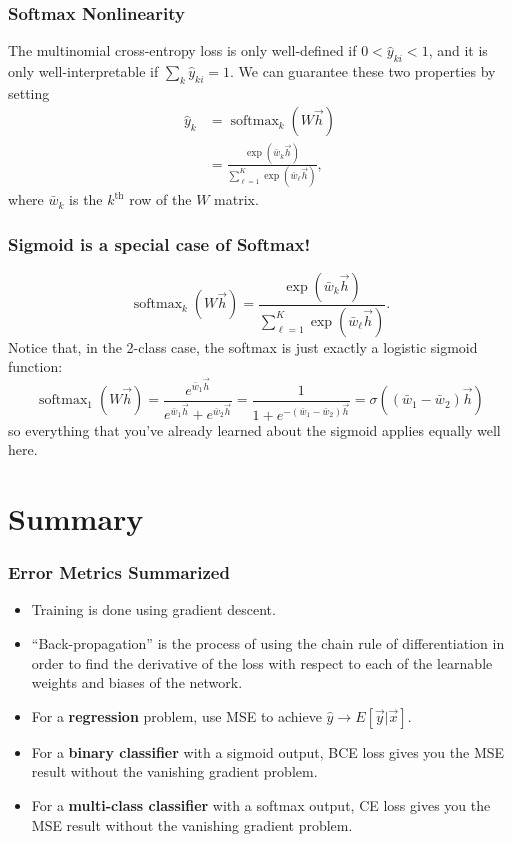 \documentclass{beamer}
\DeclareMathOperator*{\softmax}{softmax}
\begin{document}
\begin{frame}
  \frametitle{Softmax Nonlinearity}

  The multinomial cross-entropy loss is only well-defined if
  $0<\hat{y}_{ki}<1$, and it is only well-interpretable if
  $\sum_k\hat{y}_{ki}=1$.  We can guarantee these two properties by
  setting
  \begin{align*}
    \hat{y}_k &= \softmax_k\left(W\vec{h}\right)\\
    &= \frac{\exp(\bar{w}_k\vec{h})}{\sum_{\ell=1}^K
      \exp(\bar{w}_\ell\vec{h})},
  \end{align*}
  where $\bar{w}_k$ is the $k^{\textrm{th}}$ row of the $W$ matrix.
\end{frame}

\begin{frame}
  \frametitle{Sigmoid is a special case of Softmax!}

  \begin{displaymath}
    \softmax_k\left(W\vec{h}\right)
    = \frac{\exp(\bar{w}_k\vec{h})}{\sum_{\ell=1}^K
      \exp(\bar{w}_\ell\vec{h})}.
  \end{displaymath}
  Notice that, in the 2-class case, the softmax is just exactly a
  logistic sigmoid function:
  \begin{displaymath}
    \softmax_1(W\vec{h}) = \frac{e^{\bar{w}_1\vec{h}}}{e^{\bar{w}_1\vec{h}}+e^{\bar{w}_2\vec{h}}}
    = \frac{1}{1+e^{-(\bar{w}_1-\bar{w}_2)\vec{h}}}  =\sigma\left((\bar{w}_1-\bar{w}_2)\vec{h}\right)
  \end{displaymath}
  so everything that you've already learned about the sigmoid applies
  equally well here.
\end{frame}

\section{Summary}
\setcounter{subsection}{1}

\begin{frame}
  \frametitle{Error Metrics Summarized}
  \begin{itemize}
  \item Training is done using gradient descent.
  \item ``Back-propagation'' is the process of using the chain rule of differentiation
    in order to find the derivative of the loss with respect to each of the learnable weights
    and biases of the network.
  \item For a {\bf regression} problem, use MSE to achieve
    $\hat{y}\rightarrow E\left[\vec{y}|\vec{x}\right]$. 
  \item For a {\bf binary classifier} with a sigmoid output, BCE loss
    gives you the MSE result without the vanishing gradient problem.
  \item For a {\bf multi-class classifier} with a softmax output, CE
    loss gives you the MSE result without the vanishing gradient
    problem.
  \end{itemize}
\end{frame}
\end{document}
